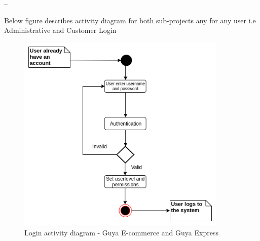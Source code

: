 

--%

Below figure describes activity diagram for both sub-projects any for any user i.e Administrative and Customer Login
\begin{figure}[!h]
\label{login_activity_diagram}
\center
\includegraphics[width=10cm,keepaspectratio]{activity-diagrams/login_activity_diagram}
\caption{Login activity diagram - Guya E-commerce and Guya Express}
\end{figure}

